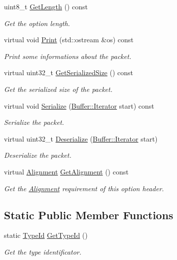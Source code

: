 \begin{DoxyCompactItemize}
uint8\+\_\+t \hyperlink{classns3_1_1dsr_1_1DsrOptionHeader_a0db5f2db2771d63e9579de6824a1cd5c}{Get\+Length} () const 
\begin{DoxyCompactList}\small\item\em Get the option length. \end{DoxyCompactList}\item 
virtual void \hyperlink{classns3_1_1dsr_1_1DsrOptionHeader_ae313f9d29f455b27d4d3c71e1cdb28c4}{Print} (std\+::ostream \&os) const 
\begin{DoxyCompactList}\small\item\em Print some informations about the packet. \end{DoxyCompactList}\item 
virtual uint32\+\_\+t \hyperlink{classns3_1_1dsr_1_1DsrOptionHeader_a654dd65cf8686660e0b7a32c84a432ce}{Get\+Serialized\+Size} () const 
\begin{DoxyCompactList}\small\item\em Get the serialized size of the packet. \end{DoxyCompactList}\item 
virtual void \hyperlink{classns3_1_1dsr_1_1DsrOptionHeader_a04d7999f22a25e1ccbde838e6c9bd7e1}{Serialize} (\hyperlink{classns3_1_1Buffer_1_1Iterator}{Buffer\+::\+Iterator} start) const 
\begin{DoxyCompactList}\small\item\em Serialize the packet. \end{DoxyCompactList}\item 
virtual uint32\+\_\+t \hyperlink{classns3_1_1dsr_1_1DsrOptionHeader_ab44c93c37011591950bb95730c1c5b06}{Deserialize} (\hyperlink{classns3_1_1Buffer_1_1Iterator}{Buffer\+::\+Iterator} start)
\begin{DoxyCompactList}\small\item\em Deserialize the packet. \end{DoxyCompactList}\item 
virtual \hyperlink{structns3_1_1dsr_1_1DsrOptionHeader_1_1Alignment}{Alignment} \hyperlink{classns3_1_1dsr_1_1DsrOptionHeader_aec0e060fd744d1c002c5b80c74a44232}{Get\+Alignment} () const 
\begin{DoxyCompactList}\small\item\em Get the \hyperlink{structns3_1_1dsr_1_1DsrOptionHeader_1_1Alignment}{Alignment} requirement of this option header. \end{DoxyCompactList}\end{DoxyCompactItemize}
\subsection*{Static Public Member Functions}
\begin{DoxyCompactItemize}
\item 
static \hyperlink{classns3_1_1TypeId}{Type\+Id} \hyperlink{classns3_1_1dsr_1_1DsrOptionHeader_a0f26b04b9befb8c62ef3612cc8e5e13f}{Get\+Type\+Id} ()
\begin{DoxyCompactList}\small\item\em Get the type identificator. \end{DoxyCompactList}\end{DoxyCompactItemize}
